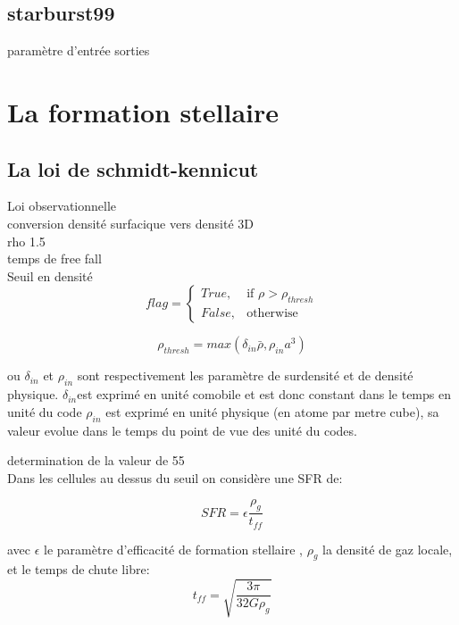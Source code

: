 \subsection{starburst99}
paramètre d'entrée
sorties



\section{La formation stellaire}

\subsection{La loi de schmidt-kennicut}
Loi observationnelle \\
conversion densité surfacique vers densité 3D\\
rho 1.5\\
temps de free fall\\

Seuil en densité \\
\begin{equation}
	flag = 
  \begin{cases}
      True, & \text{if } \rho > \rho_{thresh}\\
      False,              & \text{otherwise}
  \end{cases}
\end{equation} 




\begin{equation}
	\rho_{thresh} = max\left(  \delta_{in} \bar{\rho}, \rho_{in} a^3 \right)
\end{equation} 

ou $\delta_{in}$ et $\rho_{in}$  sont respectivement les paramètre de surdensité et de densité physique.
$\delta_{in}$est exprimé en unité comobile et est donc constant dans le temps en unité du code
 $\rho_{in}$ est exprimé en unité physique (en atome par metre cube), sa valeur evolue dans le temps du point de vue des unité du codes.

determination de la valeur de 55\\ 
 
 
Dans les cellules au dessus du seuil on considère une SFR de:

\begin{equation}
	SFR = \epsilon \frac{\rho_g}{t_{ff}}
    \label{eq_sfr}
\end{equation}


avec  $\epsilon$ le paramètre d'efficacité de formation stellaire , $\rho_g$ la densité de gaz locale, et le temps de chute libre:
\begin{equation}
t_{ff} = \sqrt{\frac{3\pi}{32G\rho_g}}
\end{equation}

